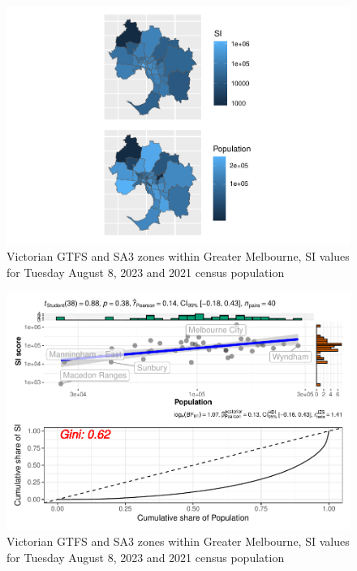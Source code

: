 \documentclass[preprint, 3p,
authoryear]{elsarticle} %
\begin{document}
\begin{figure}
\centering
\includegraphics{Leveraging_GTFS_to_assess_transit_supply_Transport_Geography_files/figure-latex/greater_melbourne_230808_by_sa3_population_and_si_plot-1.pdf}
\caption{Victorian GTFS and SA3 zones within Greater Melbourne, SI
values for Tuesday August 8, 2023 and 2021 census population}
\end{figure}

\begin{figure}
\centering
\includegraphics{Leveraging_GTFS_to_assess_transit_supply_Transport_Geography_files/figure-latex/greater_melbourne_230808_by_gini_and_scatter-1.pdf}
\caption{Victorian GTFS and SA3 zones within Greater Melbourne, SI
values for Tuesday August 8, 2023 and 2021 census population}
\end{figure}
\end{document}
